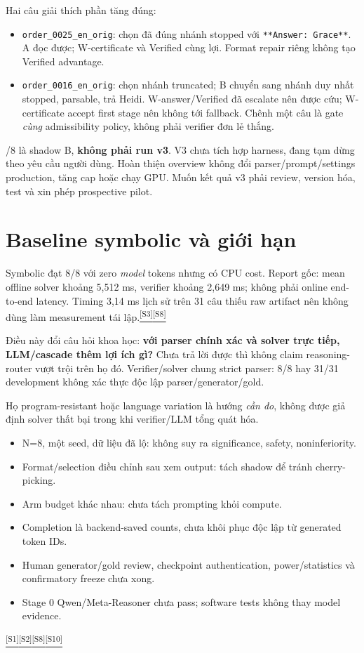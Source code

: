 \documentclass[11pt,a4paper]{article}
\newenvironment{researchnote}[1]
  {\par\addvspace{7pt}\Needspace{4\baselineskip}\begingroup\small
   \noindent{\sffamily\bfseries #1}\par\nobreak\noindent}
  {\par\endgroup\addvspace{5pt}}
\newenvironment{cautionbox}[1]{\begin{researchnote}{#1}}{\end{researchnote}}
\newcommand{\src}[1]{\hyperlink{src-#1}{\textcolor{muted}{\textsuperscript{[S#1]}}}}
\begin{document}
Hai câu giải thích phần tăng đúng:
\begin{itemize}
  \item \texttt{order\_0025\_en\_orig}: chọn đã đúng nhánh stopped với \texttt{**Answer: Grace**}. A đọc được; W-certificate và Verified cùng lợi. Format repair riêng không tạo Verified advantage.
  \item \texttt{order\_0016\_en\_orig}: chọn nhánh truncated; B chuyển sang nhánh duy nhất stopped, parsable, trả Heidi. W-answer/Verified đã escalate nên được cứu; W-certificate accept first stage nên không tới fallback. Chênh một câu là gate \emph{cùng} admissibility policy, không phải verifier đơn lẻ thắng.
\end{itemize}

\begin{cautionbox}{Trạng thái v3}
6/8 là shadow B, \textbf{không phải run v3}. V3 chưa tích hợp harness, đang tạm dừng theo yêu cầu người dùng. Hoàn thiện overview không đổi parser/prompt/settings production, tăng cap hoặc chạy GPU. Muốn kết quả v3 phải review, version hóa, test và xin phép prospective pilot.
\end{cautionbox}

\section{Baseline symbolic và giới hạn}
Symbolic đạt 8/8 với zero \emph{model} tokens nhưng có CPU cost. Report gốc: mean offline solver khoảng 5,512 ms, verifier khoảng 2,649 ms; không phải online end-to-end latency. Timing 3,14 ms lịch sử trên 31 câu thiếu raw artifact nên không dùng làm measurement tái lập.\src{3}\src{8}

Điều này đổi câu hỏi khoa học: \textbf{với parser chính xác và solver trực tiếp, LLM/cascade thêm lợi ích gì?} Chưa trả lời được thì không claim reasoning-router vượt trội trên họ đó. Verifier/solver chung strict parser: 8/8 hay 31/31 development không xác thực độc lập parser/generator/gold.

Họ program-resistant hoặc language variation là hướng \emph{cần đo}, không được giả định solver thất bại trong khi verifier/LLM tổng quát hóa.
\begin{itemize}
  \item N=8, một seed, dữ liệu đã lộ: không suy ra significance, safety, noninferiority.
  \item Format/selection điều chỉnh sau xem output: tách shadow để tránh cherry-picking.
  \item Arm budget khác nhau: chưa tách prompting khỏi compute.
  \item Completion là backend-saved counts, chưa khôi phục độc lập từ generated token IDs.
  \item Human generator/gold review, checkpoint authentication, power/statistics và confirmatory freeze chưa xong.
  \item Stage 0 Qwen/Meta-Reasoner chưa pass; software tests không thay model evidence.
\end{itemize}
\src{1}\src{2}\src{8}\src{10}
\end{document}
